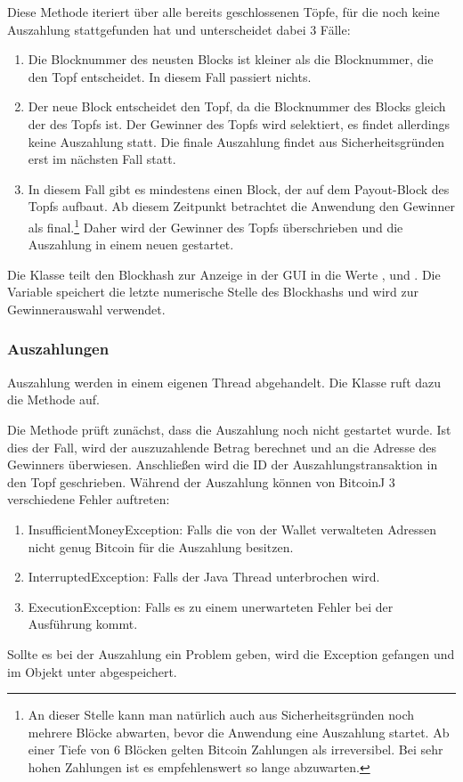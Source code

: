 Diese Methode iteriert über alle bereits geschlossenen Töpfe, für die noch keine Auszahlung stattgefunden hat und unterscheidet dabei 3 Fälle:
\begin{enumerate}
\item Die Blocknummer des neusten Blocks ist kleiner als die Blocknummer, die den Topf entscheidet. In diesem Fall passiert nichts.
\item Der neue Block entscheidet den Topf, da die Blocknummer des Blocks gleich der  des Topfs ist. Der Gewinner des Topfs wird selektiert, es findet allerdings keine Auszahlung statt. Die finale Auszahlung findet aus Sicherheitsgründen erst im nächsten Fall statt.
\item In diesem Fall gibt es mindestens einen Block, der auf dem Payout-Block des Topfs aufbaut. Ab diesem Zeitpunkt betrachtet die Anwendung den Gewinner als final.\footnote{An dieser Stelle kann man natürlich auch aus Sicherheitsgründen noch mehrere Blöcke abwarten, bevor die Anwendung eine Auszahlung startet. Ab einer Tiefe von 6 Blöcken gelten Bitcoin Zahlungen als irreversibel. Bei sehr hohen Zahlungen ist es empfehlenswert so lange abzuwarten.} Daher wird der Gewinner des Topfs überschrieben und die Auszahlung in einem neuen  gestartet.
\end{enumerate}

Die Klasse  teilt den Blockhash zur Anzeige in der GUI in die Werte ,  und . Die Variable  speichert die letzte numerische Stelle des Blockhashs und wird zur Gewinnerauswahl verwendet.







\subsubsection{Auszahlungen}
Auszahlung werden in einem eigenen Thread abgehandelt. Die Klasse  ruft dazu die  Methode auf.

Die Methode prüft zunächst, dass die Auszahlung noch nicht gestartet wurde. Ist dies der Fall, wird der auszuzahlende Betrag berechnet und an die Adresse des Gewinners überwiesen. Anschließen wird die ID der Auszahlungstransaktion in den Topf geschrieben. Während der Auszahlung können von BitcoinJ 3 verschiedene Fehler auftreten:
\begin{enumerate}
\item InsufficientMoneyException: Falls die von der Wallet verwalteten Adressen nicht genug Bitcoin für die Auszahlung besitzen.
\item InterruptedException: Falls der Java Thread unterbrochen wird.
\item ExecutionException: Falls es zu einem unerwarteten Fehler bei der Ausführung kommt.
\end{enumerate}
Sollte es bei der Auszahlung ein Problem geben, wird die Exception gefangen und im  Objekt unter  abgespeichert.


